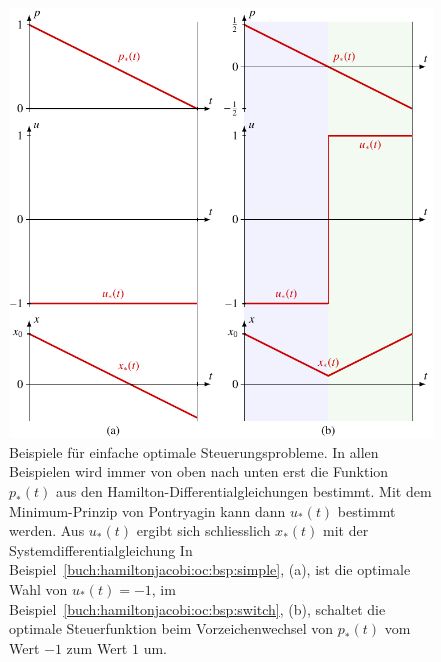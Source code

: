 %
%
%
\begin{figure}
\centering
\includegraphics{chapters/080-hamiltonjacobi/images/oc.pdf}
\caption{Beispiele für einfache optimale Steuerungsprobleme.
In allen Beispielen wird immer von oben nach unten erst die Funktion
$p_*(t)$ aus den Hamilton-Differentialgleichungen bestimmt.
Mit dem Minimum-Prinzip von Pontryagin kann dann $u_*(t)$ bestimmt
werden.
Aus $u_*(t)$ ergibt sich schliesslich $x_*(t)$ mit der
Systemdifferentialgleichung
In Beispiel~\ref{buch:hamiltonjacobi:oc:bsp:simple}, (a), ist die
optimale Wahl von $u_*(t)=-1$, im
Beispiel~\ref{buch:hamiltonjacobi:oc:bsp:switch}, (b), schaltet die
optimale Steuerfunktion beim Vorzeichenwechsel von $p_*(t)$ vom
Wert $-1$ zum Wert $1$ um.
\label{buch:hamiltonjacobi:oc:fig:oc}}
\end{figure}
